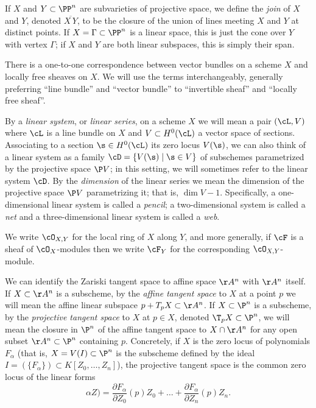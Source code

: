 If $X$ and $Y \subset \PP^n$ are subvarieties of projective space, we define the \emph{join} of $X$ and $Y$, denoted $\overline{X\,Y}$, to be the closure of the union of lines meeting $X$ and $Y$ at distinct points. If $X = \Gamma \subset \PP^n$ is a linear space, this is just the cone over $Y$ with vertex $\Gamma$; if $X$ and $Y$ are both linear subspaces, this is simply their span.

There is a one-to-one correspondence between vector bundles on a scheme $X$ and locally free sheaves on $X$. We will use the terms interchangeably, generally preferring ``line bundle'' and ``vector bundle'' to ``invertible sheaf'' and ``locally free sheaf''.


By a \emph{linear system}, or \emph{linear series}, on a scheme $X$ we will mean a pair $(\cL, V)$ where $\cL$ is a line bundle on $X$ and $V \subset H^0(\cL)$ a vector space of sections. Associating to a section $\s \in H^0(\cL)$ its zero locus $V(\s)$, we can also think of a linear system as a family $\cD = \{ V(\s) \mid \s \in V\}$ of subschemes parametrized by the projective space $\P V$; in this setting, we will sometimes refer to the linear system $\cD$. By the \emph{dimension} of the linear series we mean the dimension of the projective space $\P V$ parametrizing it; that is, $\dim V - 1$. Specifically, a one-dimensional linear system is called a \emph{pencil}; a two-dimensional system is called a \emph{net} and a three-dimensional linear system is called a \emph{web}.

We write $\cO_{X,Y}$
for the local ring of $X$ along $Y$, and more generally, if $\cF$ is a sheaf of
$\cO_{X}$-modules then we write $\cF_Y$ for the 
corresponding $\cO_{X,Y}$-module.

We can identify the Zariski tangent space to affine space $\AA^n$ with $\AA^n$ itself. If $X \subset \AA^n$ is a subscheme, by the \emph{affine tangent space} to $X$ at a point $p$ we will mean the affine linear subspace $p + T_pX \subset \AA^n$. If $X \subset \P^n$ is a subscheme, by the \emph{projective tangent space} to $X$ at $p \in X$, denoted $\T_pX \subset \P^n$, we will mean the closure in $\P^n$ of the affine tangent space to $X \cap \AA^n$ for any open subset $\AA^n \subset \P^n$ containing $p$. Concretely, if $X$ is the zero locus of polynomials $F_\alpha$ (that is, $X = V(I) \subset \P^n$ is the subscheme defined by the ideal $I = (\{F_\alpha\}) \subset K[Z_0,\dots,Z_n]$), the projective tangent space is the common zero locus of the linear forms
$$
\alpha Z) = \frac{\partial F_\alpha}{\partial Z_0}(p)Z_0 + \dots + \frac{\partial F_\alpha}{\partial Z_n}(p)Z_n.
$$

